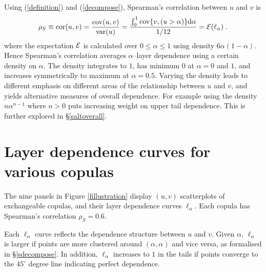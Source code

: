 \documentclass[authoryear]{elsarticle}
\newcommand{\var}{{\rm var}}
\newcommand{\cov}{{\rm cov}}
\newcommand{\E}{{\mathrm E}}
\newcommand{\Ex}{{\cal E}}
\newcommand{\cor}{\mathrm{cor}}
\newcommand{\de}{\mathrm{d}}
\newcommand{\cq}{\ ,\quad }
\newcommand{\eref}[1]{(\ref{#1})}
\newcommand{\fref}[1]{Figure \ref{#1}}
\newcommand{\sref}[1]{\S\ref{#1}}
\begin{document}
Using  \eref{definition} and \eref{decompose}, Spearman's correlation between $u$ and $v$ is
\begin{equation}\label{wtdaverage}
\rho_S\equiv \cor(u,v) =\frac{\cov(u,v)}{\var(u)}=\frac{\int _0^1\cov\{v,(u>\alpha)\}\de\alpha}{1/12}
=\Ex(\ell_\alpha)\; .
\end{equation}
where the expectation $\Ex$ is calculated over $0\le\alpha\le 1$ using density $6\alpha(1-\alpha)$. Hence Spearman's correlation averages $\alpha$--layer dependence using a certain density on $\alpha$. The density integrates to $1$, has minimum $0$ at $\alpha=0$ and $1$, and increases symmetrically to maximum at $\alpha=0.5$. Varying the density leads to different emphasis on different areas of the relationship between $u$ and $v$, and yields alternative measures of overall dependence. For example using the density $n\alpha^{n-1}$ where $n>0$ puts increasing weight on upper tail dependence. This is further explored in \sref{saltoverall}. 

\section{Layer dependence curves for various copulas}\label{sldcurve}

The nine panels in \fref{fillustration} display $(u,v)$ scatterplots of exchangeable copulas, and their layer dependence curves $\ell_\alpha$. Each copula has Spearman's correlation $\rho_S=0.6$.

Each $\ell_\alpha$ curve reflects the dependence structure between $u$ and $v$. Given $\alpha$, $\ell_\alpha$ is larger if points are more clustered around $(\alpha,\alpha)$ and vice versa, as formalised in  \sref{sdecompose}. In addition, $\ell_\alpha$ increases to $1$ in the tails if points converge to the $45^\circ$ degree line indicating perfect dependence.
\end{document}
